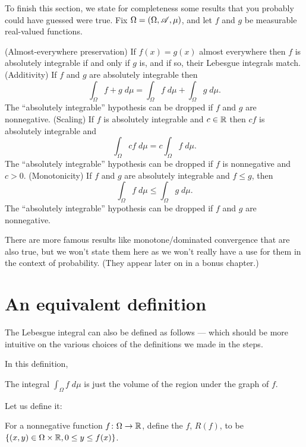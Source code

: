 To finish this section, we state for completeness
some results that you probably could have guessed were true.
Fix $\Omega = (\Omega, \mathscr A, \mu)$, and
let $f$ and $g$ be measurable real-valued functions.
\begin{itemize}
	\ii (Almost-everywhere preservation)
	If $f(x) = g(x)$ almost everywhere then
	$f$ is absolutely integrable if and only if $g$ is,
	and if so, their Lebesgue integrals match.
	\ii (Additivity)
	If $f$ and $g$ are absolutely integrable then
	\[ \int_\Omega f+g \; d\mu
		= \int_\Omega f \; d\mu
		+ \int_\Omega g \; d\mu. \]
	The ``absolutely integrable'' hypothesis can be dropped
	if $f$ and $g$ are nonnegative.
	\ii (Scaling) If $f$ is absolutely integrable and $c \in \mathbb R$
	then $cf$ is absolutely integrable and
	\[ \int_\Omega cf \; d\mu = c \int_\Omega f \; d\mu. \]
	The ``absolutely integrable'' hypothesis can be dropped
	if $f$ is nonnegative and $c > 0$.
	\ii (Monotonicity)
	If $f$ and $g$ are absolutely integrable and $f \le g$, then
	\[ \int_\Omega f \; d\mu \le \int_\Omega g \; d\mu. \]
	The ``absolutely integrable'' hypothesis can be dropped
	if $f$ and $g$ are nonnegative.
\end{itemize}
There are more famous results like monotone/dominated convergence
that are also true, but we won't state them here
as we won't really have a use for them in the context of probability.
(They appear later on in a bonus chapter.)

\section{An equivalent definition}
\label{sec:lebesgue_int_equivalent_def}

The Lebesgue integral can also be defined as follows --- which should be more intuitive on the various
choices of the definitions we made in the steps.

In this definition,
\begin{moral}
	The integral $\int_\Omega f \; d\mu$ is just the volume of the region under the graph of $f$.
\end{moral}

Let us define it:
\setcounter{step}{0}
\begin{step}
	For a nonnegative function $f \colon \Omega \to \mathbb R$, define the 
	$f$, $R(f)$, to be $\{(x, y) \in \Omega \times \mathbb R, 0 \leq y \leq f(x)\}$.
\end{step}

